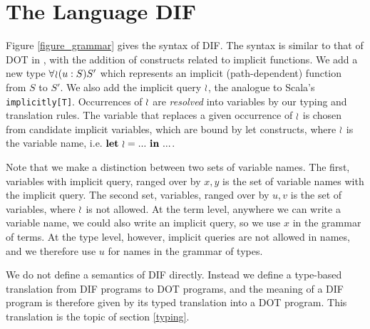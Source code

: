 \section{The Language DIF}
Figure \ref{figure_grammar} gives the syntax of DIF. The syntax is similar to
that of DOT in \cite{AGORS16}, with the addition of constructs related to
implicit functions. We add a new type $\forall\!\wr\!(u:S)S'$ which represents an
implicit (path-dependent) function from $S$ to $S'$. We also add the implicit
query $\wr$, the analogue to Scala's \texttt{implicitly[T]}. Occurrences of
$\wr$ are \emph{resolved} into variables by our typing and translation rules.
The variable that replaces a given occurrence of $\wr$ is chosen from
candidate implicit variables, which are bound by let constructs, where $\wr$
is the variable name, i.e. $\textbf{let}\ \wr = ...\ \textbf{in}\ ...$.

Note that we make a distinction between two sets of variable names. The first,
variables with implicit query, ranged over by $x, y$ is the set of variable
names with the implicit query. The second set, variables, ranged over by $u, v$
is the set of variables, where $\wr$ is not allowed. At the term level,
anywhere we can write a variable name, we could also write an implicit query,
so we use $x$ in the grammar of terms. At the type level, however, implicit
queries are not allowed in names, and we therefore use $u$ for names in the
grammar of types.

\begin{figure*}[h]
    
    \caption{Grammar of DIF}
    \label{figure_grammar}
\end{figure*}

We do not define a semantics of DIF directly. Instead we define a type-based
translation from DIF programs to DOT programs, and the meaning of a DIF program
is therefore given by its typed translation into a DOT program. This
translation is the topic of section \ref{typing}.
